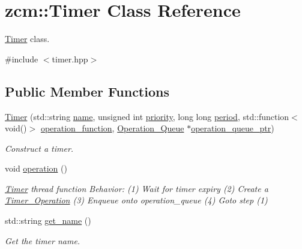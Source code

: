 \hypertarget{classzcm_1_1Timer}{\section{zcm\-:\-:Timer Class Reference}
\label{classzcm_1_1Timer}
}


\hyperlink{classzcm_1_1Timer}{Timer} class.  




{\ttfamily \#include $<$timer.\-hpp$>$}

\subsection*{Public Member Functions}
\begin{DoxyCompactItemize}
\item 
\hyperlink{classzcm_1_1Timer_a1283d5045e825f0f07c1cf3117eb1904}{Timer} (std\-::string \hyperlink{classzcm_1_1Timer_abfd2bb014b496ce2eda5a5837e9275f1}{name}, unsigned int \hyperlink{classzcm_1_1Timer_a722f6390254d106117d8e1545b6092ab}{priority}, long long \hyperlink{classzcm_1_1Timer_a36c7498a7ad5706ceca83429e6c1759c}{period}, std\-::function$<$ void()$>$ \hyperlink{classzcm_1_1Timer_a07f820c2d67029b83547bbfd77fc3690}{operation\-\_\-function}, \hyperlink{classzcm_1_1Operation__Queue}{Operation\-\_\-\-Queue} $\ast$\hyperlink{classzcm_1_1Timer_a9f2ce34fb9230c4251355fde956b7220}{operation\-\_\-queue\-\_\-ptr})
\begin{DoxyCompactList}\small\item\em Construct a timer. \end{DoxyCompactList}\item 
void \hyperlink{classzcm_1_1Timer_a4baed4e019656ed2612aaa0374cc0fa9}{operation} ()
\begin{DoxyCompactList}\small\item\em \hyperlink{classzcm_1_1Timer}{Timer} thread function Behavior\-: (1) Wait for timer expiry (2) Create a \hyperlink{classzcm_1_1Timer__Operation}{Timer\-\_\-\-Operation} (3) Enqueue onto operation\-\_\-queue (4) Goto step (1) \end{DoxyCompactList}\item 
std\-::string \hyperlink{classzcm_1_1Timer_a4a4aaf655539dec8ca7e747e230f8655}{get\-\_\-name} ()
\begin{DoxyCompactList}\small\item\em Get the timer name. \end{DoxyCompactList}\item 

\end{DoxyCompactItemize}
